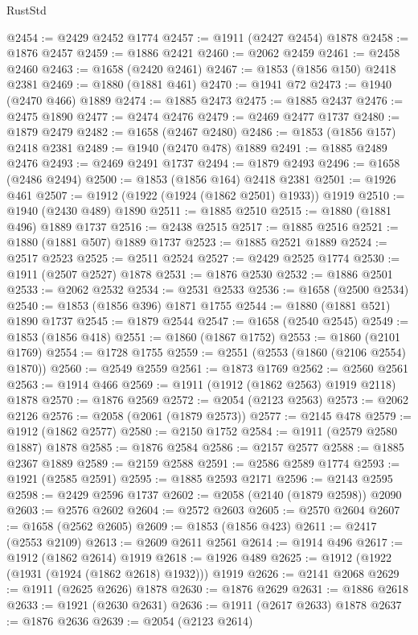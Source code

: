 \begin{lexlean}{RustStd}
\begin{coremodule}
@2454 := @2429 @2452 @1774
@2457 := @1911 (@2427 @2454) @1878
@2458 := @1876 @2457
@2459 := @1886 @2421
@2460 := @2062 @2459
@2461 := @2458 @2460
@2463 := @1658 (@2420 @2461)
@2467 := @1853 (@1856 @150) @2418 @2381
@2469 := @1880 (@1881 @461)
@2470 := @1941 @72
@2473 := @1940 (@2470 @466) @1889
@2474 := @1885 @2473
@2475 := @1885 @2437
@2476 := @2475 @1890
@2477 := @2474 @2476
@2479 := @2469 @2477 @1737
@2480 := @1879 @2479
@2482 := @1658 (@2467 @2480)
@2486 := @1853 (@1856 @157) @2418 @2381
@2489 := @1940 (@2470 @478) @1889
@2491 := @1885 @2489 @2476
@2493 := @2469 @2491 @1737
@2494 := @1879 @2493
@2496 := @1658 (@2486 @2494)
@2500 := @1853 (@1856 @164) @2418 @2381
@2501 := @1926 @461
@2507 := @1912 (@1922 (@1924 (@1862 @2501) @1933)) @1919
@2510 := @1940 (@2430 @489) @1890
@2511 := @1885 @2510
@2515 := @1880 (@1881 @496) @1889 @1737
@2516 := @2438 @2515
@2517 := @1885 @2516
@2521 := @1880 (@1881 @507) @1889 @1737
@2523 := @1885 @2521 @1889
@2524 := @2517 @2523
@2525 := @2511 @2524
@2527 := @2429 @2525 @1774
@2530 := @1911 (@2507 @2527) @1878
@2531 := @1876 @2530
@2532 := @1886 @2501
@2533 := @2062 @2532
@2534 := @2531 @2533
@2536 := @1658 (@2500 @2534)
@2540 := @1853 (@1856 @396) @1871 @1755
@2544 := @1880 (@1881 @521) @1890 @1737
@2545 := @1879 @2544
@2547 := @1658 (@2540 @2545)
@2549 := @1853 (@1856 @418)
@2551 := @1860 (@1867 @1752)
@2553 := @1860 (@2101 @1769)
@2554 := @1728 @1755
@2559 := @2551 (@2553 (@1860 (@2106 @2554) @1870))
@2560 := @2549 @2559
@2561 := @1873 @1769
@2562 := @2560 @2561
@2563 := @1914 @466
@2569 := @1911 (@1912 (@1862 @2563) @1919 @2118) @1878
@2570 := @1876 @2569
@2572 := @2054 (@2123 @2563)
@2573 := @2062 @2126
@2576 := @2058 (@2061 (@1879 @2573))
@2577 := @2145 @478
@2579 := @1912 (@1862 @2577)
@2580 := @2150 @1752
@2584 := @1911 (@2579 @2580 @1887) @1878
@2585 := @1876 @2584
@2586 := @2157 @2577
@2588 := @1885 @2367 @1889
@2589 := @2159 @2588
@2591 := @2586 @2589 @1774
@2593 := @1921 (@2585 @2591)
@2595 := @1885 @2593 @2171
@2596 := @2143 @2595
@2598 := @2429 @2596 @1737
@2602 := @2058 (@2140 (@1879 @2598)) @2090
@2603 := @2576 @2602
@2604 := @2572 @2603
@2605 := @2570 @2604
@2607 := @1658 (@2562 @2605)
@2609 := @1853 (@1856 @423)
@2611 := @2417 (@2553 @2109)
@2613 := @2609 @2611 @2561
@2614 := @1914 @496
@2617 := @1912 (@1862 @2614) @1919
@2618 := @1926 @489
@2625 := @1912 (@1922 (@1931 (@1924 (@1862 @2618) @1932))) @1919
@2626 := @2141 @2068
@2629 := @1911 (@2625 @2626) @1878
@2630 := @1876 @2629
@2631 := @1886 @2618
@2633 := @1921 (@2630 @2631)
@2636 := @1911 (@2617 @2633) @1878
@2637 := @1876 @2636
@2639 := @2054 (@2123 @2614)

\end{coremodule}
\end{lexlean}
